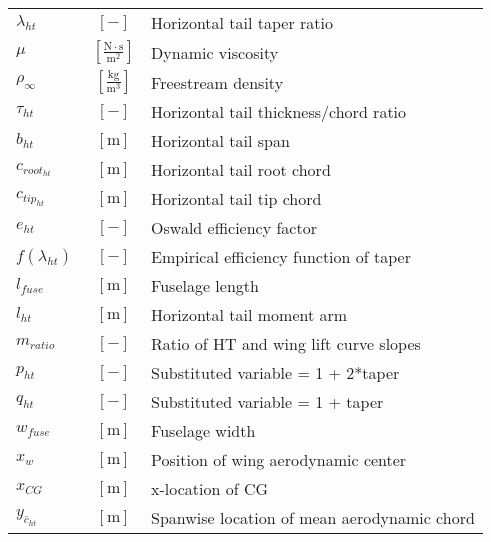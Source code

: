{\begin{supertabular}{lcl}
$\lambda_{ht}$ & $~[-]$ & Horizontal tail taper ratio \\
$\mu$ & $~\mathrm{[\tfrac{N\cdot s}{m^{2}}]}$ & Dynamic viscosity \\
$\rho_{\infty}$ & $~\mathrm{[\tfrac{kg}{m^{3}}]}$ & Freestream density \\
$\tau_{ht}$ & $~[-]$ & Horizontal tail thickness/chord ratio \\
$b_{ht}$ & $~\mathrm{[m]}$ & Horizontal tail span \\
$c_{root_{ht}}$ & $~\mathrm{[m]}$ & Horizontal tail root chord \\
$c_{tip_{ht}}$ & $~\mathrm{[m]}$ & Horizontal tail tip chord \\
$e_{ht}$ & $~[-]$ & Oswald efficiency factor \\
$f(\lambda_{ht})$ & $~[-]$ & Empirical efficiency function of taper \\
$l_{fuse}$ & $~\mathrm{[m]}$ & Fuselage length \\
$l_{ht}$ & $~\mathrm{[m]}$ & Horizontal tail moment arm \\
$m_{ratio}$ & $~[-]$ & Ratio of HT and wing lift curve slopes\\
$p_{ht}$ & $~[-]$ & Substituted variable = 1 + 2*taper \\
$q_{ht}$ & $~[-]$ & Substituted variable = 1 + taper \\
$w_{fuse}$ & $~\mathrm{[m]}$ & Fuselage width \\
$x_w$ & $~\mathrm{[m]}$ & Position of wing aerodynamic center \\
$x_{CG}$ & $~\mathrm{[m]}$ & x-location of CG \\
$y_{\bar{c}_{ht}}$ & $~\mathrm{[m]}$ & Spanwise location of mean aerodynamic chord \\
\bottomrule
\end{supertabular}}

% 
